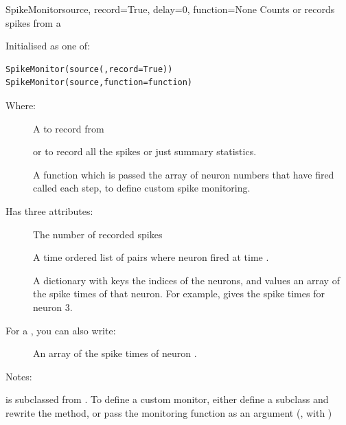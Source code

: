 \documentclass[letterpaper,10pt,english]{manual}
\begin{document}
\hypertarget{brian.SpikeMonitor}{}\begin{classdesc}{SpikeMonitor}{source, record=True, delay=0, function=None}
Counts or records spikes from a \hyperlink{brian.NeuronGroup}{}

Initialised as one of:

\begin{Verbatim}[commandchars=@\[\]]
SpikeMonitor(source(,record=True))
SpikeMonitor(source,function=function)
\end{Verbatim}

Where:
\begin{description}
\item[] \leavevmode
A \hyperlink{brian.NeuronGroup}{} to record from

\item[] \leavevmode
{} or  to record all the spikes or just summary
statistics.

\item[] \leavevmode
A function  which is passed the array of neuron
numbers that have fired called each step, to define
custom spike monitoring.

\end{description}

Has three attributes:
\begin{description}
\item[] \leavevmode
The number of recorded spikes

\item[] \leavevmode
A time ordered list of pairs  where neuron  fired
at time .

\item[] \leavevmode
A dictionary with keys the indices of the neurons, and values an
array of the spike times of that neuron. For example,
 gives the spike times for neuron 3.

\end{description}

For  a \hyperlink{brian.SpikeMonitor}{}, you can also write:
\begin{description}
\item[] \leavevmode
An array of the spike times of neuron .

\end{description}

Notes:

\hyperlink{brian.SpikeMonitor}{} is subclassed from \hyperlink{brian.Connection}{}.
To define a custom monitor, either define a subclass and
rewrite the  method, or pass the monitoring function
as an argument (, with )
\end{classdesc}
\end{document}
